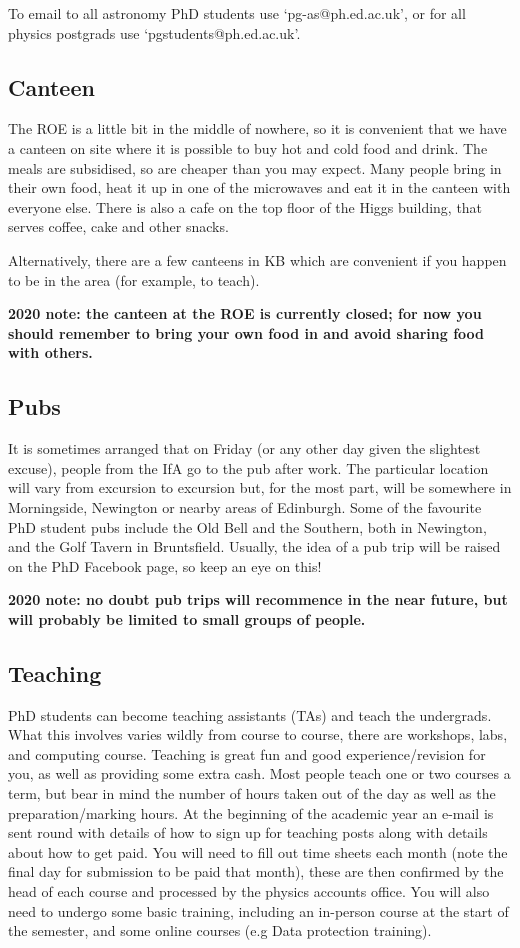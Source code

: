 To email to all astronomy PhD students use `pg-as@ph.ed.ac.uk', or for all physics postgrads use `pgstudents@ph.ed.ac.uk'. 

\subsection{Canteen}

The ROE is a little bit in the middle of nowhere, so it is convenient that we have a
canteen on site where it is possible to buy hot and cold food and drink. The meals are
subsidised, so are cheaper than you may expect. 
Many people bring in their own food, heat it up in one of the microwaves and eat
it in the canteen with everyone else. There is also a cafe on the top floor of the Higgs building, that serves coffee, cake and other snacks.

Alternatively, there are a few canteens in KB which are convenient if you happen to
be in the area (for example, to teach).

{\bf 2020 note: the canteen at the ROE is currently closed; for now you should remember to bring your own food in and avoid sharing food with others.}

\subsection{Pubs}

It is sometimes arranged that on Friday (or any other day given the slightest excuse),
people from the IfA go to the pub after work. The particular location will vary from excursion to
excursion but, for the most part, will be somewhere in Morningside, Newington or nearby areas
of Edinburgh. Some of the favourite PhD student pubs include the Old Bell and the Southern, both in Newington, and the Golf Tavern in Bruntsfield. Usually, the idea of a pub trip will be raised on the PhD Facebook page, so keep an eye on this! 

{\bf 2020 note: no doubt pub trips will recommence in the near future, but will probably be limited to small groups of people.}

\subsection{Teaching}

PhD students can become teaching assistants (TAs) and teach the
undergrads. What this involves varies wildly from course to course,
there are workshops, labs, and computing course.
Teaching is great fun and good experience/revision for
you, as well as providing some extra cash.  Most people teach one or
two courses a term, but bear in mind the number of hours taken out of
the day as well as the preparation/marking hours.  At the beginning of
the academic year an e-mail is sent round with details of how to sign
up for teaching posts along with details about how to get paid.  You
will need to fill out time sheets each month (note the final day for
submission to be paid that month), these are then confirmed by the
head of each course and processed by the physics accounts office. You will also need to undergo some basic training, including an in-person course at the start of the semester, and some online courses (e.g Data protection training).


